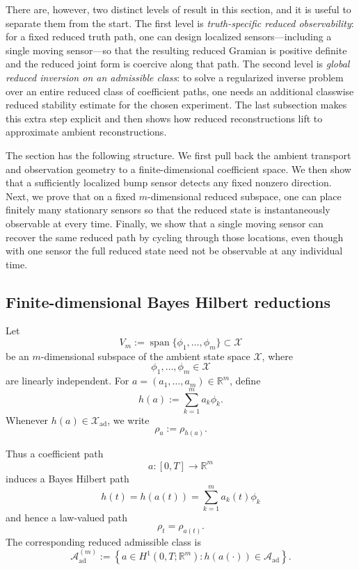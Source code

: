 \documentclass{article}
\theoremstyle{definition}
\begin{document}
There are, however, two distinct levels of result in this section, and it is useful to separate them
from the start. The first level is \emph{truth-specific reduced observability}: for a fixed reduced
truth path, one can design localized sensors---including a single moving sensor---so that the
resulting reduced Gramian is positive definite and the reduced joint form is coercive along that
path. The second level is \emph{global reduced inversion on an admissible class}: to solve a
regularized inverse problem over an entire reduced class of coefficient paths, one needs an
additional classwise reduced stability estimate for the chosen experiment. The last subsection
makes this extra step explicit and then shows how reduced reconstructions lift to approximate
ambient reconstructions.

The section has the following structure. We first pull back the ambient transport and observation
geometry to a finite-dimensional coefficient space. We then show that a sufficiently localized bump
sensor detects any fixed nonzero direction. Next, we prove that on a fixed
\(m\)-dimensional reduced subspace, one can place finitely many stationary sensors so that the
reduced state is instantaneously observable at every time. Finally, we show that a single moving
sensor can recover the same reduced path by cycling through those locations, even though with one
sensor the full reduced state need not be observable at any individual time.

\subsection{Finite-dimensional Bayes Hilbert reductions}

Let
\[
    V_m:=\operatorname{span}\{\phi_1,\dots,\phi_m\}\subset \mathcal X
\]
be an \(m\)-dimensional subspace of the ambient state space \(\mathcal X\), where
\[
    \phi_1,\dots,\phi_m\in \mathcal X
\]
are linearly independent. For \(a=(a_1,\dots,a_m)\in\mathbb R^m\), define
\begin{equation}
    \label{eq:finite-dimensional-state}
    h(a):=\sum_{k=1}^m a_k\phi_k.
\end{equation}
Whenever \(h(a)\in \mathcal X_{\mathrm{ad}}\), we write
\[
    \rho_a:=\rho_{h(a)}.
\]


Thus a coefficient path
\[
    a:[0,T]\to\mathbb R^m
\]
induces a Bayes Hilbert path
\[
    h(t)=h(a(t))=\sum_{k=1}^m a_k(t)\phi_k
\]
and hence a law-valued path
\[
    \rho_t=\rho_{a(t)}.
\]
The corresponding reduced admissible class is
\[
    \mathcal A_{\mathrm{ad}}^{(m)}
    :=
    \left\{
    a\in H^1(0,T;\mathbb R^m)
    :
    h(a(\cdot))\in \mathcal A_{\mathrm{ad}}
    \right\}.
\]
\end{document}
